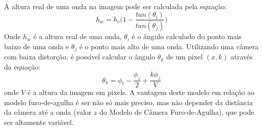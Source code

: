 \paragraph{}A altura real de uma onda na imagem pode ser calculada pela equação:
\[
        h_{w} = h_{c}\Bigg(1 - \frac{tan(\theta_{i})}{tan(\theta_{j})}\Bigg)
\]
\noindent{}Onde \(h_{w}\) é a altura real de uma onda, \(\theta_{i}\) é o ângulo calculado do ponto mais baixo de uma onda e \(\theta_{j}\) é o ponto mais alto de uma onda. Utilizando uma câmera com baixa distorção, é possível calcular o ângulo \(\theta_{k}\) de um pixel \((x,k)\) através da equação:
\[
        \theta_{k} = \phi_{t} - \frac{\phi_{z}}{2} + \frac{k\phi_{z}}{V}
\]
\noindent{}onde \(V\) é a altura da imagem em pixels. A vantagem deste modelo em relação ao modelo furo-de-agulha é ser não só mais preciso, mas não depender da distância da câmera até a onda (valor $z$ do Modelo de Câmera Furo-de-Agulha), que pode ser altamente variável.

